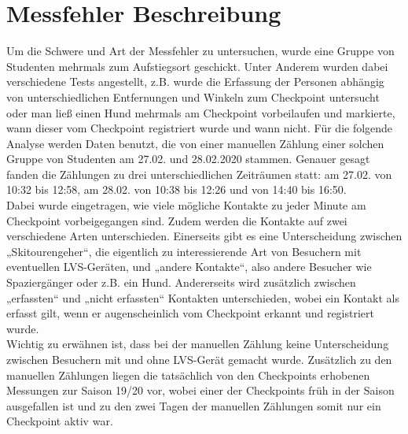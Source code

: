 \documentclass[12pt]{scrreprt}
\begin{document}
\section{Messfehler Beschreibung}
Um die Schwere und Art der Messfehler zu untersuchen, wurde eine Gruppe von Studenten mehrmals zum Aufstiegsort geschickt. Unter Anderem wurden dabei verschiedene Tests angestellt, z.B. wurde die Erfassung der Personen abhängig von unterschiedlichen Entfernungen und Winkeln zum Checkpoint untersucht oder man ließ einen Hund mehrmals am Checkpoint vorbeilaufen und markierte, wann dieser vom Checkpoint registriert wurde und wann nicht. Für die folgende Analyse werden Daten benutzt, die von einer manuellen Zählung einer solchen Gruppe von Studenten am 27.02. und 28.02.2020 stammen. Genauer gesagt fanden die Zählungen zu drei unterschiedlichen Zeiträumen statt: am 27.02. von 10:32 bis 12:58, am 28.02. von 10:38 bis 12:26 und von 14:40 bis 16:50. \\
Dabei wurde eingetragen, wie viele mögliche Kontakte zu jeder Minute am Checkpoint vorbeigegangen sind. Zudem werden die Kontakte auf zwei verschiedene Arten unterschieden. Einerseits gibt es eine Unterscheidung zwischen „Skitourengeher“, die eigentlich zu interessierende Art von Besuchern mit eventuellen LVS-Geräten, und „andere Kontakte“, also andere Besucher wie Spaziergänger oder z.B. ein Hund. Andererseits wird zusätzlich zwischen „erfassten“ und „nicht erfassten“ Kontakten unterschieden, wobei ein Kontakt als erfasst gilt, wenn er augenscheinlich vom Checkpoint erkannt und registriert wurde.\\
Wichtig zu erwähnen ist, dass bei der manuellen Zählung keine Unterscheidung zwischen Besuchern mit und ohne LVS-Gerät gemacht wurde. Zusätzlich zu den manuellen Zählungen liegen die tatsächlich von den Checkpoints erhobenen Messungen zur Saison 19/20 vor, wobei einer der Checkpoints früh in der Saison ausgefallen ist und zu den zwei Tagen der manuellen Zählungen somit nur ein Checkpoint aktiv war.
\end{document}
